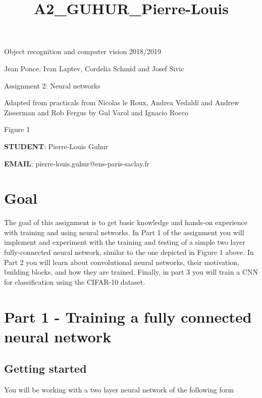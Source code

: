 \documentclass[11pt]{article}
\title{A2\_GUHUR\_Pierre-Louis}
\begin{document}
    
    
    \maketitle
    
    

    
    Object recognition and computer vision 2018/2019

Jean Ponce, Ivan Laptev, Cordelia Schmid and Josef Sivic

Assignment 2: Neural networks

Adapted from practicals from Nicolas le Roux, Andrea Vedaldi and Andrew
Zisserman and Rob Fergus by Gul Varol and Ignacio Rocco

Figure 1

    \textbf{STUDENT}: Pierre-Louis Guhur

\textbf{EMAIL}: pierre-louis.guhur@ens-paris-saclay.fr

    \hypertarget{goal}{%
\section{Goal}\label{goal}}

    The goal of this assignment is to get basic knowledge and hands-on
experience with training and using neural networks. In Part 1 of the
assignment you will implement and experiment with the training and
testing of a simple two layer fully-connected neural network, similar to
the one depicted in Figure 1 above. In Part 2 you will learn about
convolutional neural networks, their motivation, building blocks, and
how they are trained. Finally, in part 3 you will train a CNN for
classification using the CIFAR-10 dataset.

    \hypertarget{part-1---training-a-fully-connected-neural-network}{%
\section{Part 1 - Training a fully connected neural
network}\label{part-1---training-a-fully-connected-neural-network}}

    \hypertarget{getting-started}{%
\subsection{Getting started}\label{getting-started}}

    You will be working with a two layer neural network of the following
form
\end{document}
